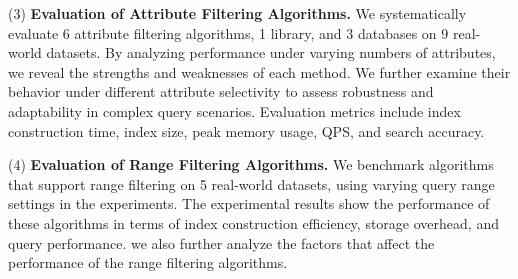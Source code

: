 \documentclass[sigconf, nonacm]{acmart}
\begin{document}
	(3)\textbf{ Evaluation of Attribute Filtering Algorithms.}
	We systematically evaluate 6 attribute filtering algorithms, 1 library, and 3 databases on 9 real-world datasets. By analyzing performance under varying numbers of attributes, we reveal the strengths and weaknesses of each method. We further examine their behavior under different attribute selectivity to assess robustness and adaptability in complex query scenarios. Evaluation metrics include index construction time, index size, peak memory usage, QPS, and search accuracy.
%	

	(4)\textbf{ Evaluation of Range Filtering Algorithms.}
	We benchmark algorithms that support range filtering on 5 real-world datasets, using varying query range settings in the experiments. The experimental results show the performance of these algorithms in terms of index construction efficiency, storage overhead, and query performance. we also further analyze the factors that affect the performance of the range filtering algorithms.
	
\end{document}
